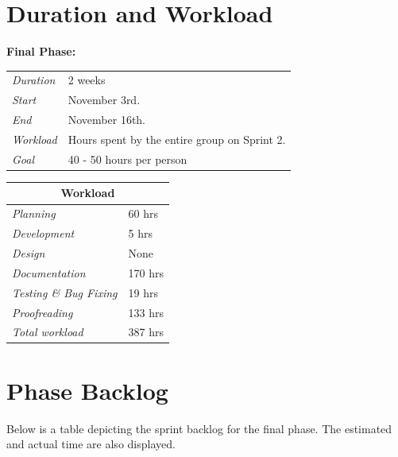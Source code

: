 \section{Duration and Workload}
\label{sec:FinalWorkload}
%
\begin{minipage}{\linewidth}
\centering
\setlength{\tabcolsep}{22pt}
\textbf{Final Phase:} 
\smallskip
{}
\begin{tabular}{ |l l| }
	\hline
	\it{Duration} & 2 weeks \\
	\it{Start} & November 3rd. \\
	\it{End} & November 16th. \\
	\it{Workload} & Hours spent by the entire group on Sprint 2. \\
	\it{Goal} & 40 - 50 hours per person \\
	\hline
\end{tabular}
\end{minipage}
\bigskip
%
\begin{minipage}{\linewidth}
\setlength{\tabcolsep}{25pt}
\centering
{}
\begin{tabular}{ |l|l| }
	\hline
	\multicolumn{2}{|c|}{\cellcolor{gray!25} Workload} \\
	\hline
	\it{Planning} & 60 hrs \\
	\it{Development} & 5 hrs \\
	\it{Design} & None \\
	\it{Documentation} & 170 hrs \\
	\it{Testing \& Bug Fixing} & 19 hrs \\
	\it{Proofreading} & 133 hrs \\
	\hline
	\it{Total workload} & 387 hrs \\
	\hline
\end{tabular}
\end{minipage}

\section{Phase Backlog}
\label{sec:FinalBacklog}

Below is a table depicting the sprint backlog for the final phase. The estimated and actual time are also displayed.

